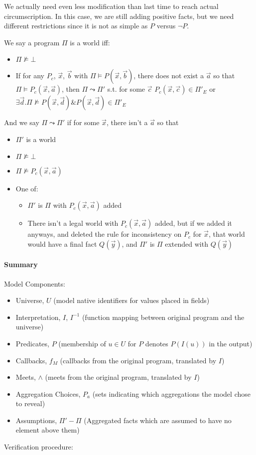 We actually need even less modification than last time to reach actual circumscription.
In this case, we are still adding positive facts, but we need different restrictions since it is not as simple as $P$ versus $\neg P$.

We say a program $\Pi$ is a world iff:
\begin{itemize}
	\item $\Pi \not \models \bot$
	\item If for any $P_c$, $\vec{x}$, $\vec{b}$ with $\Pi \models P(\vec{x}, \vec{b})$, there does not exist a $\vec{a}$ so that $\Pi \models P_c(\vec{x}, \vec{a})$, then $\Pi \leadsto \Pi'$ s.t. for some $\vec{c}$ $P_c(\vec{x}, \vec{c}) \in \Pi'_E$ or $\exists \vec{d}. \Pi \not \models P(\vec{x}, \vec{d}) \& P(\vec{x}, \vec{d}) \in \Pi'_E$
\end{itemize}

And we say $\Pi \leadsto \Pi'$ if for some $\vec{x}$, there isn't a $\vec{a}$ so that
\begin{itemize}
	\item $\Pi'$ is a world
	\item $\Pi \not \models \bot$
	\item $\Pi \not \models P_c(\vec{x}, \vec{a})$
	\item One of:
	\begin{itemize}
		\item $\Pi'$ is $\Pi$ with $P_c(\vec{x}, \vec{a})$ added
		\item There isn't a legal world with $P_c(\vec{x}, \vec{a})$ added, but if we added it anyways, and deleted the rule for inconsistency on $P_c$ for $\vec{x}$, that world would have a final fact $Q(\vec{y})$, and $\Pi'$ is $\Pi$ extended with $Q(\vec{y})$
	\end{itemize}
\end{itemize}

\paragraph{Summary}

Model Components:
\begin{itemize}
	\item Universe, $U$ (model native identifiers for values placed in fields)
	\item Interpretation, $I$, $I^{-1}$ (function mapping between original program and the universe)
	\item Predicates, $P$ (membership of $u \in U$ for $P$ denotes $P(I(u))$ in the output)
	\item Callbacks, $f_M$ (callbacks from the original program, translated by $I$)
	\item Meets, $\wedge$ (meets from the original program, translated by $I$)
	\item Aggregation Choices, $P_a$ (sets indicating which aggregations the model chose to reveal)
	\item Assumptions, $\Pi' - \Pi$ (Aggregated facts which are assumed to have no element above them)
\end{itemize}
Verification procedure:

